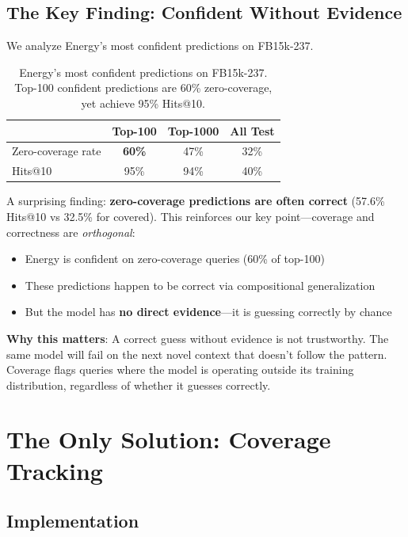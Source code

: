 \documentclass{article}
\begin{document}
\subsection{The Key Finding: Confident Without Evidence}

We analyze Energy's most confident predictions on FB15k-237.

\begin{table}[h]
\centering
\caption{Energy's most confident predictions on FB15k-237. Top-100 confident predictions are 60\% zero-coverage, yet achieve 95\% Hits@10.}
\label{tab:confident}
\begin{tabular}{lccc}
\toprule
 & Top-100 & Top-1000 & All Test \\
\midrule
Zero-coverage rate & \textbf{60\%} & 47\% & 32\% \\
Hits@10 & 95\% & 94\% & 40\% \\
\bottomrule
\end{tabular}
\end{table}

A surprising finding: \textbf{zero-coverage predictions are often correct} (57.6\% Hits@10 vs 32.5\% for covered). This reinforces our key point---coverage and correctness are \emph{orthogonal}:

\begin{itemize}
    \item Energy is confident on zero-coverage queries (60\% of top-100)
    \item These predictions happen to be correct via compositional generalization
    \item But the model has \textbf{no direct evidence}---it is guessing correctly by chance
\end{itemize}

\textbf{Why this matters}: A correct guess without evidence is not trustworthy. The same model will fail on the next novel context that doesn't follow the pattern. Coverage flags queries where the model is operating outside its training distribution, regardless of whether it guesses correctly.

\section{The Only Solution: Coverage Tracking}
\label{sec:solution}

\subsection{Implementation}
\end{document}
